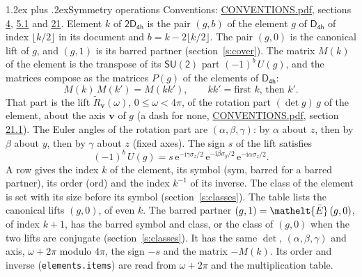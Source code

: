 \documentclass[10pt,a4paper]{article}
\makeatletter
\renewcommand\section{\@startsection{section}{1}{\z@}{-3ex plus -1ex minus -.2ex}%
  {1.2ex plus .2ex}{\normalfont\large\sffamily\bfseries\color{parttitle}}}
\numberwithin{equation}{section}
\newcommand{\eltfont}[1]{{\let\sigma\eltsigma\mathelt{#1}}}
\newcommand{\grp}[1]{\mathsf{#1}}
\newcommand{\elt}[1]{\eltfont{#1}}
\newcommand{\vv}{\mathbf{v}}
\newcommand{\iunit}{\mathrm{i}}
\newcommand{\expe}{\mathrm{e}}
\newcommand{\barred}[1]{\bar{#1}}
\newcommand{\lift}[1]{\tilde{#1}}
\newcommand{\pauli}[1]{\sigma_{#1}}
\makeatother
\begin{document}
\section{Symmetry operations}\label{s:elements}
Conventions: \href{../../CONVENTIONS.pdf}{CONVENTIONS.pdf}, sections \href{../../../rotation/CONVENTIONS.pdf\#conv.4}{4}, \href{../../../rotation/CONVENTIONS.pdf\#conv.5.1}{5.1} and \href{../../CONVENTIONS.pdf\#conv.21}{21}.
\leavevmode\label{n:index.element}\label{n:element.g}Element $k$ of $\grp{2D_{4h}}$ is the pair $(g, b)$ of the element $g$ of \href{../../../rotation/data/pdf/D4h.pdf}{$\grp{D_{4h}}$} of index $\lfloor k/2\rfloor$ in its document and $b = k - 2\lfloor k/2\rfloor$. The pair $(g, 0)$ is the canonical lift of $g$, and $(g, 1)$ is its barred partner (section~\ref{s:cover}). \label{n:matrix.element.pin}\label{n:matrix.element}The matrix $M(k)$ of the element is the transpose of its $\grp{SU(2)}$ part $(-1)^{b}\,U(g)$, and the matrices compose as the matrices $P(g)$ of the elements of $\grp{D_{4h}}$:
\begin{equation}\label{e:mprod}M(k)\,M(k') = M(kk'),\qquad kk' = \text{first } k\text{, then } k'.\end{equation}
\leavevmode\label{n:angle.omega}\label{n:vector.axis}\label{n:vector.pole}That part is the lift $\lift{R}_{\vv}(\omega)$, $0 \le \omega < 4\pi$, of the rotation part $(\det g)\,g$ of the element, about the axis $\vv$ of $g$ (a dash for none, \href{../../CONVENTIONS.pdf}{CONVENTIONS.pdf}, section \href{../../CONVENTIONS.pdf\#conv.21.1}{21.1}). \label{n:angle.euler.alpha}\label{n:angle.euler.beta}\label{n:angle.euler.gamma}\label{n:vector.coordinates}The Euler angles of the rotation part are $(\alpha,\beta,\gamma)$: by $\alpha$ about $z$, then by $\beta$ about $y$, then by $\gamma$ about $z$ (fixed axes). \label{n:local.euler.sign}The sign $s$ of the lift satisfies
\begin{equation}\label{e:euler}(-1)^{b}\,U(g) = s\,\expe^{-\iunit\gamma\pauli{z}/2}\,\expe^{-\iunit\beta\pauli{y}/2}\,\expe^{-\iunit\alpha\pauli{z}/2}.\end{equation}
\leavevmode\label{n:index.element.inverse}\label{n:head.sym}\label{n:head.ord}A row gives the index $k$ of the element, its symbol (sym, barred for a barred partner), its order (ord) and the index $k^{-1}$ of its inverse. \label{n:head.class}The class of the element is set with its size before its symbol (section~\ref{s:classes}).
The table lists the canonical lifts $(g, 0)$, of even $k$. The barred partner $(g, 1) = \elt{\barred{E}}\,(g, 0)$, of index $k + 1$, has the barred symbol and class, or the class of $(g, 0)$ when the two lifts are conjugate (section~\ref{s:classes}). It has the same $\det$, $(\alpha,\beta,\gamma)$ and axis, $\omega + 2\pi$ modulo $4\pi$, the sign $-s$ and the matrix $-M(k)$. Its order and inverse (\texttt{elements.items}) are read from $\omega + 2\pi$ and the multiplication table.
\end{document}
